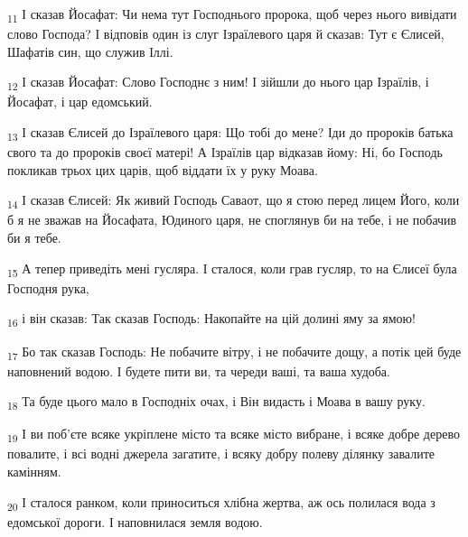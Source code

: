 \begin{tcolorbox}
\textsubscript{11} І сказав Йосафат: Чи нема тут Господнього пророка, щоб через нього вивідати слово Господа? І відповів один із слуг Ізраїлевого царя й сказав: Тут є Єлисей, Шафатів син, що служив Іллі.
\end{tcolorbox}
\begin{tcolorbox}
\textsubscript{12} І сказав Йосафат: Слово Господнє з ним! І зійшли до нього цар Ізраїлів, і Йосафат, і цар едомський.
\end{tcolorbox}
\begin{tcolorbox}
\textsubscript{13} І сказав Єлисей до Ізраїлевого царя: Що тобі до мене? Іди до пророків батька свого та до пророків своєї матері! А Ізраїлів цар відказав йому: Ні, бо Господь покликав трьох цих царів, щоб віддати їх у руку Моава.
\end{tcolorbox}
\begin{tcolorbox}
\textsubscript{14} І сказав Єлисей: Як живий Господь Саваот, що я стою перед лицем Його, коли б я не зважав на Йосафата, Юдиного царя, не споглянув би на тебе, і не побачив би я тебе.
\end{tcolorbox}
\begin{tcolorbox}
\textsubscript{15} А тепер приведіть мені гусляра. І сталося, коли грав гусляр, то на Єлисеї була Господня рука,
\end{tcolorbox}
\begin{tcolorbox}
\textsubscript{16} і він сказав: Так сказав Господь: Накопайте на цій долині яму за ямою!
\end{tcolorbox}
\begin{tcolorbox}
\textsubscript{17} Бо так сказав Господь: Не побачите вітру, і не побачите дощу, а потік цей буде наповнений водою. І будете пити ви, та череди ваші, та ваша худоба.
\end{tcolorbox}
\begin{tcolorbox}
\textsubscript{18} Та буде цього мало в Господніх очах, і Він видасть і Моава в вашу руку.
\end{tcolorbox}
\begin{tcolorbox}
\textsubscript{19} І ви поб'єте всяке укріплене місто та всяке місто вибране, і всяке добре дерево повалите, і всі водні джерела загатите, і всяку добру полеву ділянку завалите камінням.
\end{tcolorbox}
\begin{tcolorbox}
\textsubscript{20} І сталося ранком, коли приноситься хлібна жертва, аж ось полилася вода з едомської дороги. І наповнилася земля водою.
\end{tcolorbox}
